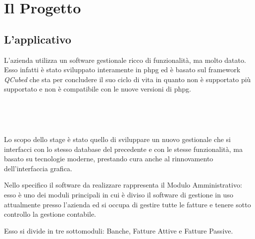 
\chapter{Il Progetto}
\label{cap:progetto}


\section{L'applicativo}

	L’azienda utilizza un software gestionale ricco di funzionalità, ma molto datato.
	Esso infatti è stato sviluppato interamente in \gls{phpg}\cite{site:php} ed è basato sul framework \textit{QCubed}\cite{site:QCubed} che
	sta per concludere il suo ciclo di vita in quanto non è supportato più supportato e non è compatibile con le nuove versioni di \gls{phpg}.
	\paragraph{\\ \\}
	Lo scopo dello stage è stato quello di sviluppare un nuovo gestionale che si interfacci con lo stesso database del precedente e con le stesse
	funzionalità, ma basato su tecnologie moderne, prestando cura anche al rinnovamento
	dell’interfaccia grafica.
	
	Nello specifico il software da realizzare rappresenta il Modulo Amministrativo: esso è uno dei moduli principali in cui è diviso il
	software di gestione in uso attualmente presso l’azienda ed si occupa di gestire tutte le fatture e tenere sotto controllo la gestione contabile.
	
	Esso si divide in tre sottomoduli: Banche, Fatture Attive e Fatture Passive.
	
